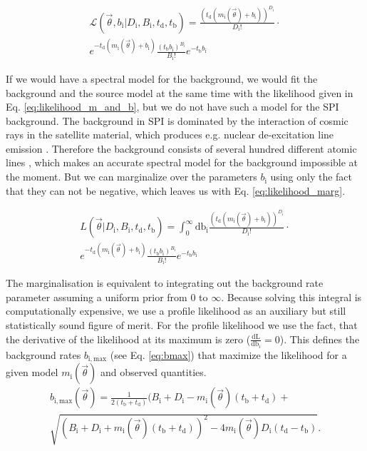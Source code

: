 \documentclass[twocolumn]{aa}
\begin{document}
\begin{multline}
	\mathcal{L}(\vec{\theta}, b_{\mathrm{i}}|D_{\mathrm{i}}, B_{\mathrm{i}},t_{\mathrm{d}},t_{\mathrm{b}}) = \frac{(t_{\mathrm{d}}(m_{\mathrm{i}}(\vec{\theta})+ b_{\mathrm{i}}))^{D_{\mathrm{i}}}}{D_{\mathrm{i}}!}\cdot \\
  e^{-t_{\mathrm{d}}(m_{\mathrm{i}}(\vec{\theta})+b_{\mathrm{i}})}\frac{(t_{\mathrm{b}} b_{\mathrm{i}})^{B_{\mathrm{i}}}}{B_{\mathrm{i}}!} e^{-t_{\mathrm{b}} b_{\mathrm{i}}}
  \label{eq:likelihood_m_and_b}
\end{multline}

If we would have a spectral model for the background, we would fit the background and the source model at the same time with the likelihood given in Eq. \ref{eq:likelihood_m_and_b}, but we do not have such a model for the SPI background. The background in SPI is dominated by the interaction of cosmic rays in the satellite material, which produces e.g. nuclear de-excitation line emission \citep{spi_bkg}. Therefore the background consists of several hundred different atomic lines \citep{spi_bkg}, which makes an accurate spectral model for the background impossible at the moment. But we can marginalize over the parameters $b_{\mathrm{i}}$ using only the fact that they can not be negative, which leaves us with Eq. \ref{eq:likelihood_marg}.

\begin{multline}
	L(\vec{\theta}|D_{\mathrm{i}}, B_{\mathrm{i}},t_{\mathrm{d}},t_{\mathrm{b}}) = \int_{0}^{\infty}\textrm{db}_{\mathrm{i}}\frac{(t_{\mathrm{d}}(m_{\mathrm{i}}(\vec{\theta})+ b_{\mathrm{i}}))^{D_{\mathrm{i}}}}{D_{\mathrm{i}}!}\cdot\\
  e^{-t_{\mathrm{d}}(m_{\mathrm{i}}(\vec{\theta})+b_{\mathrm{i}})} \frac{(t_{\mathrm{b}} b_{\mathrm{i}})^{B_{\mathrm{i}}}}{B_{\mathrm{i}}!} e^{-t_{\mathrm{b}}b_{\mathrm{i}}}
  \label{eq:likelihood_marg}
\end{multline}

The marginalisation is equivalent to integrating out the background rate parameter assuming a uniform prior from 0 to $\infty$. Because solving this integral is computationally expensive, we use a profile likelihood as an auxiliary but still statistically sound figure of merit. For the profile likelihood we use the fact, that the derivative of the likelihood at its maximum is zero ($\frac{\textrm{dL}}{\textrm{db}_i}=0$). This defines the background rates $b_\mathrm{{i, max}}$ (see Eq. \ref{eq:bmax}) that maximize the likelihood for a given model $m_{\mathrm{i}}(\vec{\theta})$ and observed quantities.
\begin{multline}
	b_{\mathrm{i,max}}(\vec{\theta})=\frac{1}{2(t_{\mathrm{b}}+t_{\mathrm{d}})}(B_{\mathrm{i}}+D_{\mathrm{i}}-m_{\mathrm{i}}(\vec{\theta})(t_{\mathrm{b}}+t_{\mathrm{d}})+\\
  \sqrt{(B_{\mathrm{i}}+D_{\mathrm{i}}+m_{\mathrm{i}}(\vec{\theta})(t_{\mathrm{b}}+t_{\mathrm{d}}))^{2}-4m_{\mathrm{i}}(\vec{\theta})D_{\mathrm{i}}(t_{\mathrm{d}}-t_{\mathrm{b}})}.
  \label{eq:bmax}
\end{multline}
\end{document}
